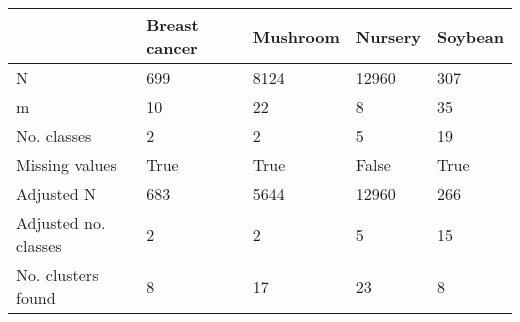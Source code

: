 \begin{tabular}{lllll}
\toprule
{} & Breast cancer & Mushroom & Nursery & Soybean \\
\midrule
N                    &           699 &     8124 &   12960 &     307 \\
m                    &            10 &       22 &       8 &      35 \\
No. classes          &             2 &        2 &       5 &      19 \\
Missing values       &          True &     True &   False &    True \\
Adjusted N           &           683 &     5644 &   12960 &     266 \\
Adjusted no. classes &             2 &        2 &       5 &      15 \\
No. clusters found   &             8 &       17 &      23 &       8 \\
\bottomrule
\end{tabular}

